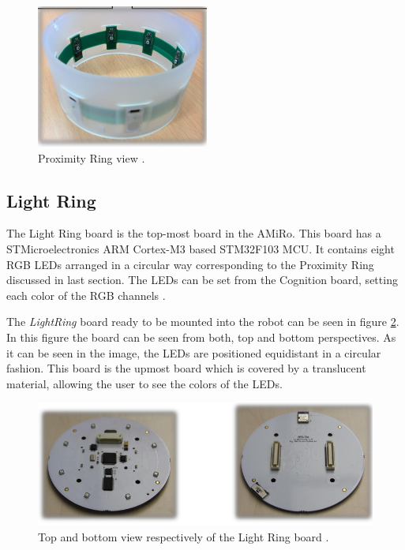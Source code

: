 \documentclass[12pt]{report}%
\begin{document}
\begin{figure}[ht]
	\centering
	\includegraphics[]{prox_ring_real}
    \caption{Proximity Ring view \cite{AMiRo_ppt_v1}.}
    \label{fig:proxring}
\end{figure}
\clearpage

\subsection{Light Ring}
The Light Ring board is the top-most board in the AMiRo. This board has a STMicroelectronics ARM Cortex-M3 based STM32F103 MCU. It contains eight RGB LEDs arranged in a circular way corresponding to the Proximity Ring discussed in last section. The LEDs can be set from the Cognition board, setting each color of the RGB channels \cite{AMiRo_paper_modular}.

The \textit{LightRing} board ready to be mounted into the robot can be seen in figure \ref{fig:lightr}. In this figure the board can be seen from both, top and bottom perspectives. As it can be seen in the image, the LEDs are positioned equidistant in a circular fashion. This board is the upmost board which is covered by a translucent material, allowing the user to see the colors of the LEDs.

\begin{figure}[ht]
	\centering
	\includegraphics[width=\textwidth]{light_real}
    \caption{Top and bottom view respectively of the Light Ring board \cite{AMiRo_ppt_v1}.}
    \label{fig:lightr}
\end{figure}
\clearpage
\end{document}
